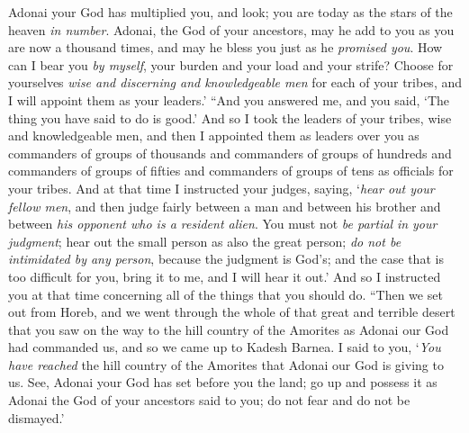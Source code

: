 \begin{biblechapter}
{{{\verse Adonai your God has multiplied you, and look; you are today as the stars of the heaven \textit{in number}.
\verse Adonai, the God of your ancestors, may he add to you as you are now a thousand times, and may he bless you just as he \textit{promised you}.
\verse How can I bear you \textit{by myself}, your burden and your load and your strife?
\verse Choose for yourselves \textit{wise and discerning and knowledgeable men} for each of your tribes, and I will appoint them as your leaders.’
\verse “And you answered me, and you said, ‘The thing you have said to do is good.’
\verse And so I took the leaders of your tribes, wise and knowledgeable men, and then I appointed them as leaders over you as commanders of groups of thousands and commanders of groups of hundreds and commanders of groups of fifties and commanders of groups of tens as officials for your tribes.
\verse And at that time I instructed your judges, saying, ‘\textit{hear out your fellow men}, and then judge fairly between a man and between his brother and between \textit{his opponent who is a resident alien}.
\verse You must not \textit{be partial} \textit{in your judgment};  hear out the small person as also the great person; \textit{do not be intimidated by any person}, because the judgment is God’s; and the case that is too difficult for you, bring it to me, and I will hear it out.’
\verse And so I instructed you at that time concerning all of the things that you should do.
\verse “Then we set out from Horeb, and we went through the whole of that great and terrible desert that you saw on the way to the hill country of the Amorites as Adonai our God had commanded us, and so we came up to Kadesh Barnea.
\verse I said to you, ‘\textit{You have reached} the hill country of the Amorites that Adonai our God is giving to us.
\verse See, Adonai your God has set before you the land; go up and possess it as Adonai the God of your ancestors said to you; do not fear and do not be dismayed.’
}}}
\end{biblechapter}
